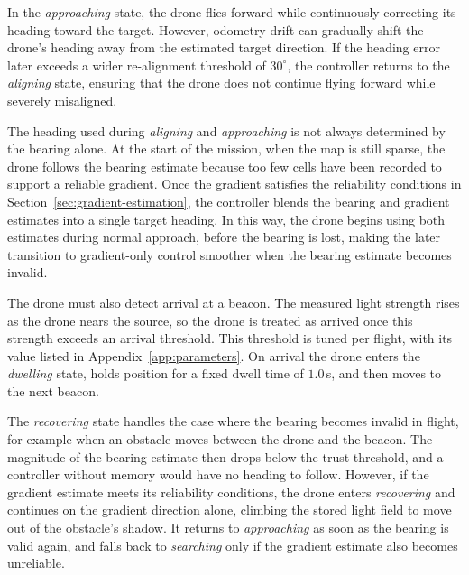 In the \emph{approaching} state, the drone flies forward while continuously correcting its heading toward the target. However, odometry drift can gradually shift the drone's heading away from the estimated target direction. If the heading error later exceeds a wider re-alignment threshold of $30^\circ$, the controller returns to the \emph{aligning} state, ensuring that the drone does not continue flying forward while severely misaligned.


The heading used during \emph{aligning} and \emph{approaching} is not always determined by the bearing alone. At the start of the mission, when the map is still sparse, the drone follows the bearing estimate because too few cells have been recorded to support a reliable gradient. Once the gradient satisfies the reliability conditions in Section~\ref{sec:gradient-estimation}, the controller blends the bearing and gradient estimates into a single target heading. In this way, the drone begins using both estimates during normal approach, before the bearing is lost, making the later transition to gradient-only control smoother when the bearing estimate becomes invalid.

The drone must also detect arrival at a beacon. The measured light strength rises as the drone nears the source, so the drone is treated as arrived once this strength exceeds an arrival threshold. This threshold is tuned per flight, with its value listed in Appendix~\ref{app:parameters}. On arrival the drone enters the \emph{dwelling} state, holds position for a fixed dwell time of $1.0$\,s, and then moves to the next beacon. 

The \emph{recovering} state handles the case where the bearing becomes invalid in flight, for example when an obstacle moves between the drone and the beacon. The magnitude of the bearing estimate then drops below the trust threshold, and a controller without memory would have no heading to follow. However, if the gradient estimate meets its reliability conditions, the drone enters \emph{recovering} and continues on the gradient direction alone, climbing the stored light field to move out of the obstacle's shadow. It returns to \emph{approaching} as soon as the bearing is valid again, and falls back to \emph{searching} only if the gradient estimate also becomes unreliable.

